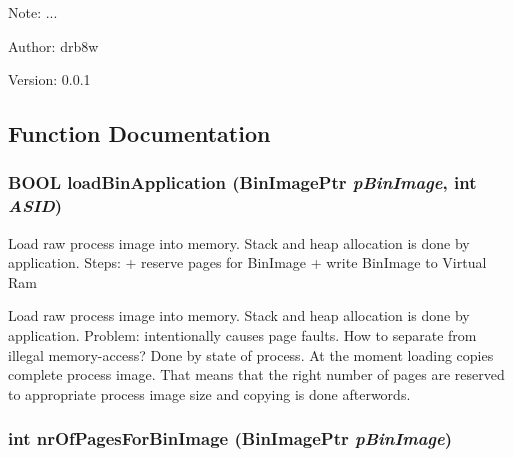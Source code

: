 \begin{Desc}
\item[Note:]... \end{Desc}
\begin{Desc}
\item[Author:]drb8w \end{Desc}
\begin{Desc}
\item[Version:]0.0.1 \end{Desc}


\subsection{Function Documentation}
\hypertarget{group___v_m_m___l_d_r_gaf0bee09e9416fef2ebaa23cd84c329b}{
\subsubsection[{loadBinApplication}]{\setlength{\rightskip}{0pt plus 5cm}BOOL loadBinApplication (BinImagePtr {\em pBinImage}, \/  int {\em ASID})}}
\label{group___v_m_m___l_d_r_gaf0bee09e9416fef2ebaa23cd84c329b}


Load raw process image into memory. Stack and heap allocation is done by application. Steps: + reserve pages for BinImage + write BinImage to Virtual Ram

Load raw process image into memory. Stack and heap allocation is done by application. Problem: intentionally causes page faults. How to separate from illegal memory-access? Done by state of process. At the moment loading copies complete process image. That means that the right number of pages are reserved to appropriate process image size and copying is done afterwords. \hypertarget{group___v_m_m___l_d_r_ga457b6bb7d7447760750e4315be37e14}{
\subsubsection[{nrOfPagesForBinImage}]{\setlength{\rightskip}{0pt plus 5cm}int nrOfPagesForBinImage (BinImagePtr {\em pBinImage})}}
\label{group___v_m_m___l_d_r_ga457b6bb7d7447760750e4315be37e14}



